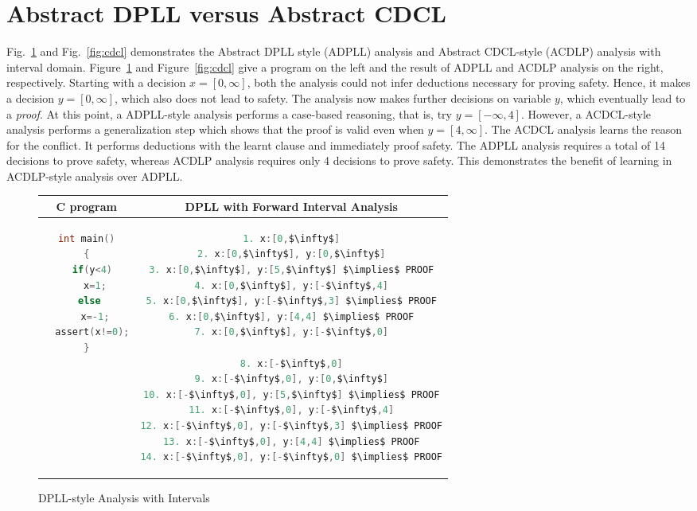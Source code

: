 {\section{Abstract DPLL versus Abstract CDCL}
%
Fig.~\ref{fig:dpll} and Fig.~\ref{fig:cdcl} demonstrates the Abstract DPLL
style (ADPLL) analysis and Abstract CDCL-style (ACDLP) analysis with
interval domain.  Figure~\ref{fig:dpll} and Figure~\ref{fig:cdcl} give a
program on the left and the result of ADPLL and ACDLP analysis on the right,
respectively.  Starting with a decision $x=[0,\infty]$, both the analysis
could not infer deductions necessary for proving safety.  Hence, it makes a
decision $y=[0,\infty]$, which also does not lead to safety.  The analysis
now makes further decisions on variable $y$, which eventually lead to a {\em
proof}.  At this point, a ADPLL-style analysis performs a case-based
reasoning, that is, try $y=[-\infty, 4]$.  However, a ACDCL-style analysis
performs a generalization step which shows that the proof is valid even when
$y=[4,\infty]$.  The ACDCL analysis learns the reason for the conflict.  It
performs deductions with the learnt clause and immediately proof safety. 
The ADPLL analysis requires a total of 14 decisions to prove safety, whereas
ACDLP analysis requires only 4 decisions to prove safety.  This demonstrates
the benefit of learning in ACDLP-style analysis over ADPLL.

\begin{figure}[t]
\centering
\begin{tabular}{c|c}
\hline
C program & DPLL with Forward Interval Analysis \\
\hline
\scriptsize
\begin{lstlisting}[mathescape=true,language=C]
int main()
{
  if(y<4)
   x=1;
  else 
   x=-1;
  assert(x!=0);
}
\end{lstlisting}
&
\begin{lstlisting}[mathescape=true,language=C]
1. x:[0,$\infty$]
2. x:[0,$\infty$], y:[0,$\infty$]
3. x:[0,$\infty$], y:[5,$\infty$] $\implies$ PROOF
4. x:[0,$\infty$], y:[-$\infty$,4]
5. x:[0,$\infty$], y:[-$\infty$,3] $\implies$ PROOF
6. x:[0,$\infty$], y:[4,4] $\implies$ PROOF
7. x:[0,$\infty$], y:[-$\infty$,0]

8. x:[-$\infty$,0]
9. x:[-$\infty$,0], y:[0,$\infty$]
10. x:[-$\infty$,0], y:[5,$\infty$] $\implies$ PROOF
11. x:[-$\infty$,0], y:[-$\infty$,4]
12. x:[-$\infty$,0], y:[-$\infty$,3] $\implies$ PROOF
13. x:[-$\infty$,0], y:[4,4] $\implies$ PROOF
14. x:[-$\infty$,0], y:[-$\infty$,0] $\implies$ PROOF
\end{lstlisting}
\\
\hline
\end{tabular}
\caption{\label{fig:dpll}
DPLL-style Analysis with Intervals}
\end{figure}

}
